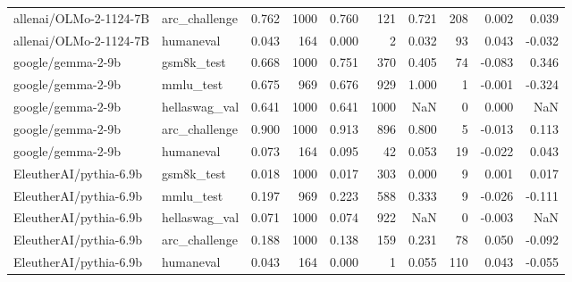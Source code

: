 \begin{tabular}{llrrrrrrrr}
allenai/OLMo-2-1124-7B & arc_challenge & 0.762 & 1000 & 0.760 & 121 & 0.721 & 208 & 0.002 & 0.039 \\
allenai/OLMo-2-1124-7B & humaneval & 0.043 & 164 & 0.000 & 2 & 0.032 & 93 & 0.043 & -0.032 \\
google/gemma-2-9b & gsm8k_test & 0.668 & 1000 & 0.751 & 370 & 0.405 & 74 & -0.083 & 0.346 \\
google/gemma-2-9b & mmlu_test & 0.675 & 969 & 0.676 & 929 & 1.000 & 1 & -0.001 & -0.324 \\
google/gemma-2-9b & hellaswag_val & 0.641 & 1000 & 0.641 & 1000 & NaN & 0 & 0.000 & NaN \\
google/gemma-2-9b & arc_challenge & 0.900 & 1000 & 0.913 & 896 & 0.800 & 5 & -0.013 & 0.113 \\
google/gemma-2-9b & humaneval & 0.073 & 164 & 0.095 & 42 & 0.053 & 19 & -0.022 & 0.043 \\
EleutherAI/pythia-6.9b & gsm8k_test & 0.018 & 1000 & 0.017 & 303 & 0.000 & 9 & 0.001 & 0.017 \\
EleutherAI/pythia-6.9b & mmlu_test & 0.197 & 969 & 0.223 & 588 & 0.333 & 9 & -0.026 & -0.111 \\
EleutherAI/pythia-6.9b & hellaswag_val & 0.071 & 1000 & 0.074 & 922 & NaN & 0 & -0.003 & NaN \\
EleutherAI/pythia-6.9b & arc_challenge & 0.188 & 1000 & 0.138 & 159 & 0.231 & 78 & 0.050 & -0.092 \\
EleutherAI/pythia-6.9b & humaneval & 0.043 & 164 & 0.000 & 1 & 0.055 & 110 & 0.043 & -0.055 \\
\bottomrule
\end{tabular}
